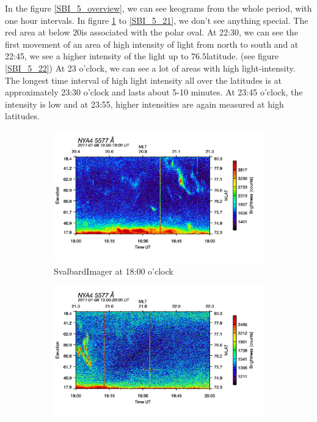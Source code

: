 \documentclass[10pt,a4paper]{article}
\begin{document}
In the figure \ref{SBI_5_overview}, we can see keograms from the whole period, with one hour intervals. In figure \ref{SBI_5_18} to \ref{SBI_5_21}, we don't see anything 
special. The red area at below $20$\textdegree is associated with the polar oval. At 22:30, we can see the first movement of an area of high intensity of light from north to 
south and at 22:45, we see a higher intensity of the light up to $76.5$\textdegree latitude. (see figure \ref{SBI_5_22})
At 23 o'clock, we can see a lot of areas with high light-intensity. The longest time interval of high light intensity all over the latitudes is at approximately 23:30 o'clock and lasts about 5-10 minutes. At 23:45 o'clock, the intensity is low and at 23:55, higher intensities are again measured at high latitudes. 
\begin{figure}[h]
\centering
\begin{subfigure}{0.3\textwidth}
\centering
	\includegraphics[width=\textwidth]{SvalbardImager5577A18.png}
	\caption{ SvalbardImager at 18:00 o'clock \label{SBI_5_18}}
\end{subfigure}
\begin{subfigure}{0.3\textwidth}
\centering
	\includegraphics[width=\textwidth]{SvalbardImager5577A19.png}

\end{subfigure}
\end{figure}
\end{document}
